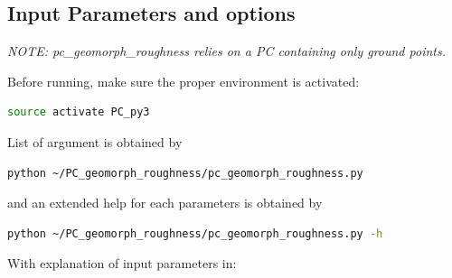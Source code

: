 \documentclass[a4paperpaper,,tablecaptionabove]{scrartcl}
\begin{document}
\hypertarget{input-parameters-and-options}{%
\subsection{Input Parameters and
options}\label{input-parameters-and-options}}

\emph{NOTE: pc\_geomorph\_roughness relies on a PC containing only
ground points. }

Before running, make sure the proper environment is activated:

\begin{lstlisting}[language=bash]
source activate PC_py3
\end{lstlisting}

List of argument is obtained by

\begin{lstlisting}[language=bash]
python ~/PC_geomorph_roughness/pc_geomorph_roughness.py
\end{lstlisting}

and an extended help for each parameters is obtained by

\begin{lstlisting}[language=bash]
python ~/PC_geomorph_roughness/pc_geomorph_roughness.py -h
\end{lstlisting}

With explanation of input parameters in:
\end{document}
